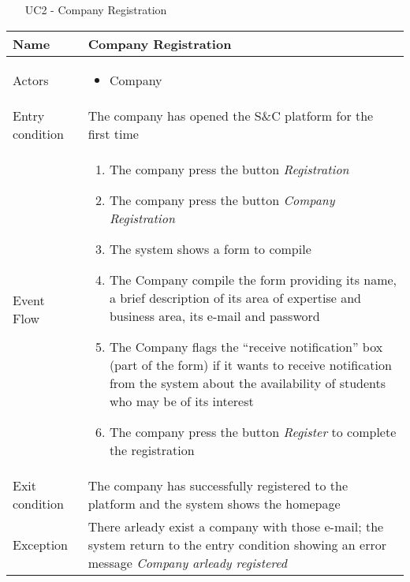 			
		
			
			\begin{table} [H]
				\centering
					\begin{itemize}
					\item [UC2] - Company Registration
				\end{itemize}
				\begin{tabular}{|| P{7.5cm} | P{7.5cm} ||}
					\hline
					Name & Company Registration \\
					\hline
					Actors & \parbox{5cm}{\begin{itemize}
							\item Company
						\end{itemize}
					} \\
					\hline
					Entry condition & The company has opened the S\&C platform for the first time \\
					\hline
					Event Flow & \parbox{5cm}{\begin{enumerate}[label=\alpha]
							\item The company press the button \textit{Registration}
							\item The company press the button \textit{Company Registration}
							\item The system shows a form to compile
							\item The Company compile the form 
							providing its name, a brief description 
							of its area of expertise and business 
							area, its e-mail and password
							\item The Company flags the “receive 
							notification” box (part of the form) if it 
							wants to receive notification from the 
							system about the availability of 
							students who may be of its interest
							\item The company press the button 
							\textit{Register} to complete the 
							registration
					\end{enumerate}} \\
					\hline 
					Exit condition & The company has successfully registered 
					to the platform and the system shows the 
					homepage \\
					\hline
					Exception & There arleady exist a company with 
					those e-mail; the system return to 
					the entry condition showing an 
					error message \textit{Company arleady 
						registered} \\
					\hline
				\end{tabular}
			\end{table}
			
